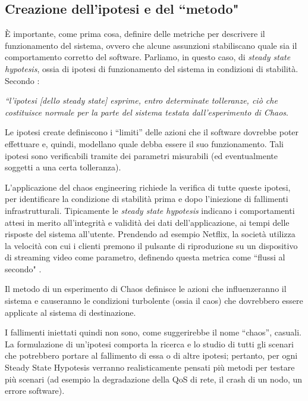         \subsection{Creazione dell’ipotesi e del ``metodo"}
        È importante, come prima cosa, definire delle metriche per descrivere il funzionamento del sistema, ovvero che alcune assunzioni stabiliscano quale sia il comportamento corretto del software. Parliamo, in questo caso, di \emph{steady state hypotesis}, ossia di ipotesi di funzionamento del sistema in condizioni di stabilità. Secondo \cite{miles}:
        
        
        \emph{``l'ipotesi [dello steady state] esprime, entro determinate tolleranze, ciò che costituisce normale per la parte del sistema testata dall'esperimento di Chaos}.
        
        
        Le ipotesi create definiscono i “limiti” delle azioni che il software dovrebbe poter effettuare e, quindi, modellano quale debba essere il suo funzionamento. Tali ipotesi sono verificabili tramite dei parametri misurabili (ed eventualmente soggetti a una certa tolleranza).
        
        L'applicazione del chaos engineering richiede la verifica di tutte queste ipotesi, per identificare la condizione di stabilità prima e dopo l'iniezione di fallimenti infrastrutturali. Tipicamente le \textit{steady state hypotesis} indicano i comportamenti attesi in merito all’integrità e validità dei dati dell’applicazione, ai tempi delle risposte del sistema all’utente. Prendendo ad esempio Netflix, la società utilizza la velocità con cui i clienti premono il pulsante di riproduzione su un dispositivo di streaming video come parametro, definendo questa metrica come ``flussi al secondo" \cite {cheatsheet}.
        
        
        Il metodo di un esperimento di Chaos definisce le azioni che influenzeranno il sistema e causeranno le condizioni turbolente (ossia il caos) che dovrebbero essere applicate al sistema di destinazione.
        
        
        I fallimenti iniettati quindi non sono, come suggerirebbe il nome “chaos”, casuali. La formulazione di un’ipotesi comporta la ricerca e lo studio di tutti gli scenari che potrebbero portare al fallimento di essa o di altre ipotesi; pertanto, per ogni Steady State Hypotesis verranno realisticamente pensati più metodi per testare più scenari (ad esempio la degradazione della QoS di rete, il crash di un nodo, un errore software).
        
